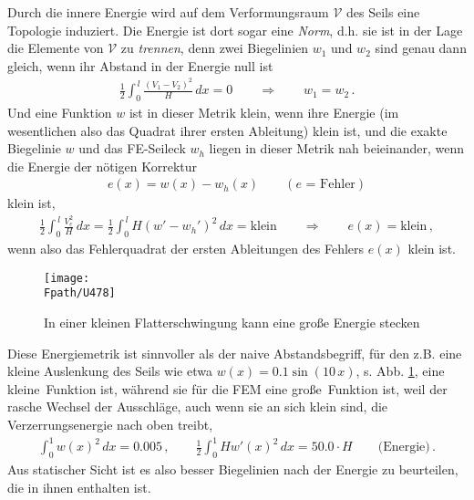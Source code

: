 Durch die innere Energie wird auf dem Verformungsraum $\mathcal{V}$ des Seils eine Topologie induziert. Die Energie ist dort sogar eine {\em Norm}, d.h. sie ist in der Lage die Elemente von $\mathcal{V}$ zu {\em trennen}, denn zwei Biegelinien $w_1$ und $w_2$ sind genau dann gleich, wenn ihr Abstand in der Energie null ist
\begin{align}
\frac{1}{2} \int_0^{\,l} \frac{(V_1 - V_2)^2}{H}\, dx = 0 \qquad \Rightarrow \qquad w_1 =
w_2\,.
\end{align}
Und eine Funktion $w$ ist in dieser Metrik klein, wenn ihre Energie (im wesentlichen also das Quadrat ihrer ersten Ableitung) klein ist, und die exakte Biegelinie $w$ und das FE-Seileck $w_{h}$ liegen in dieser Metrik nah beieinander, wenn die Energie der n\"{o}tigen Korrektur
\begin{align}
e(x) = w(x) - w_{h}(x)\qquad (\mbox{$e$ = Fehler} )
\end{align}
klein ist,
\begin{align}
\frac{1}{2} \int_0^{\,l} \frac{V_e^2}{H}\, dx  = \frac{1}{2} \int_0^{\,l} H (w' - w_h')^2
\,dx  = \mbox{klein} \qquad \Longrightarrow \qquad e(x) = \mbox{klein}\,,
\end{align}
wenn also das Fehlerquadrat der ersten Ableitungen des Fehlers $e(x)$ klein ist.
\begin{figure}[tbp] \centering
\if {} \sidecaption \fi
\texttt{[image: \\Fpath/U478]}
\caption{In einer kleinen Flatterschwingung kann eine gro{\ss}e Energie stecken} \label{Schwankung}
\end{figure}%

Diese Energiemetrik ist sinnvoller als der naive Abstandsbegriff, f\"{u}r den z.B. eine kleine Auslenkung des Seils  wie etwa $w(x) = 0.1 \sin (10 \,x)$, s. Abb. \ref{Schwankung}, eine \glq kleine\grq\ Funktion ist, w\"{a}hrend sie f\"{u}r die FEM eine \glq gro{\ss}e\grq\ Funktion ist, weil der rasche Wechsel der Ausschl\"{a}ge, auch wenn sie an sich klein sind, die Verzerrungsenergie nach oben treibt,
\begin{align}
 \int_0^1 w(x)^2 \, dx =
0.005\,, \qquad \frac{1}{2}\int_0^1 H w'(x)^2 \, dx = 50.0 \cdot H\qquad\mbox{(Energie)}\,.
\end{align}
Aus statischer Sicht ist es also besser Biegelinien nach der Energie zu beurteilen, die in ihnen enthalten ist.

